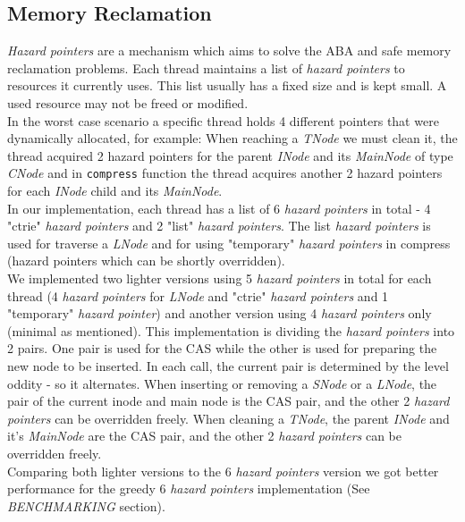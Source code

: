 \documentclass[conference]{IEEEtran}
\begin{document}
\subsection{Memory Reclamation}
	\textit{Hazard pointers} are a mechanism which aims to solve the ABA and safe memory reclamation problems\cite{hazard}\cite{wiki-hazard}. Each thread maintains a list of \textit{hazard pointers} to resources it currently uses. This list usually has a fixed size and is kept small. A used resource may not be freed or modified.\\
	In the worst case scenario a specific thread holds 4 different pointers that were dynamically allocated, for example:
	When reaching a \textit{TNode} we must clean it, the thread acquired 2 hazard pointers for the parent \textit{INode} and its \textit{MainNode} of type \textit{CNode} and in \texttt{compress} function the thread acquires another 2 hazard pointers for each \textit{INode} child and its \textit{MainNode}. \\
	In our implementation, each thread has a list of 6 \textit{hazard pointers} in total - 4 "ctrie" \textit{hazard pointers} and 2 "list" \textit{hazard pointers}. The list \textit{hazard pointers} is used for traverse a \textit{LNode} and for using "temporary" \textit{hazard pointers} in compress (hazard pointers which can be shortly overridden). \\
	We implemented two lighter versions using 5 \textit{hazard pointers} in total\cite{5-hp-cictrie} for each thread (4 \textit{hazard pointers} for \textit{LNode} and "ctrie" \textit{hazard pointers} and 1 "temporary" \textit{hazard pointer}) and another version using 4 \textit{hazard pointers} only (minimal as mentioned)\cite{4-hp-cictrie}. This implementation is dividing the \textit{hazard pointers} into 2 pairs. One pair is used for the CAS while the other is used for preparing the new node to be inserted. In each call, the current pair is determined by the level oddity - so it alternates. When inserting or removing a \textit{SNode} or a \textit{LNode}, the pair of the current inode and main node is the CAS pair, and the other 2 \textit{hazard pointers} can be overridden freely. When cleaning a \textit{TNode}, the parent \textit{INode} and it's \textit{MainNode} are the CAS pair, and the other 2 \textit{hazard pointers} can be overridden freely. \\
	Comparing both lighter versions to the 6 \textit{hazard pointers} version we got better performance for the greedy 6 \textit{hazard pointers} implementation (See \textit{BENCHMARKING} section). \\\\
\end{document}
